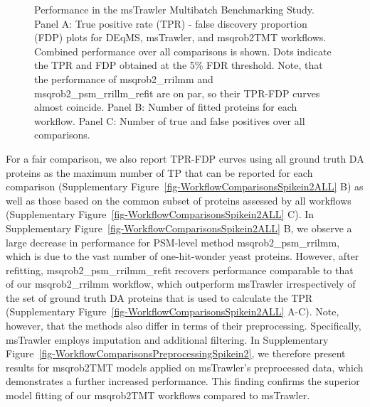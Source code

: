\documentclass[
  letterpaper,
  DIV=11,
  numbers=noendperiod]{scrartcl}
\begin{document}
\begin{figure}[H]


\caption{\label{fig-WorkflowComparisonsSpikein2}Performance in the
msTrawler Multibatch Benchmarking Study. Panel A: True positive rate
(TPR) - false discovery proportion (FDP) plots for DEqMS, msTrawler, and
msqrob2TMT workflows. Combined performance over all comparisons is
shown. Dots indicate the TPR and FDP obtained at the 5\% FDR threshold.
Note, that the performance of msqrob2\_rrilmm and
msqrob2\_psm\_rrillm\_refit are on par, so their TPR-FDP curves almost
coincide. Panel B: Number of fitted proteins for each workflow. Panel C:
Number of true and false positives over all comparisons.}

\end{figure}%

For a fair comparison, we also report TPR-FDP curves using all ground
truth DA proteins as the maximum number of TP that can be reported for
each comparison (Supplementary
Figure~\ref{fig-WorkflowComparisonsSpikein2ALL} B) as well as those
based on the common subset of proteins assessed by all workflows
(Supplementary Figure~\ref{fig-WorkflowComparisonsSpikein2ALL} C). In
Supplementary Figure~\ref{fig-WorkflowComparisonsSpikein2ALL} B, we
observe a large decrease in performance for PSM-level method
msqrob2\_psm\_rrilmm, which is due to the vast number of one-hit-wonder
yeast proteins. However, after refitting, msqrob2\_psm\_rrilmm\_refit
recovers performance comparable to that of our msqrob2\_rrilmm workflow,
which outperform msTrawler irrespectively of the set of ground truth DA
proteins that is used to calculate the TPR (Supplementary
Figure~\ref{fig-WorkflowComparisonsSpikein2ALL} A-C). Note, however,
that the methods also differ in terms of their preprocessing.
Specifically, msTrawler employs imputation and additional filtering. In
Supplementary Figure~\ref{fig-WorkflowComparisonsPreprocessingSpikein2},
we therefore present results for msqrob2TMT models applied on
msTrawler's preprocessed data, which demonstrates a further increased
performance. This finding confirms the superior model fitting of our
msqrob2TMT workflows compared to msTrawler.
\end{document}
